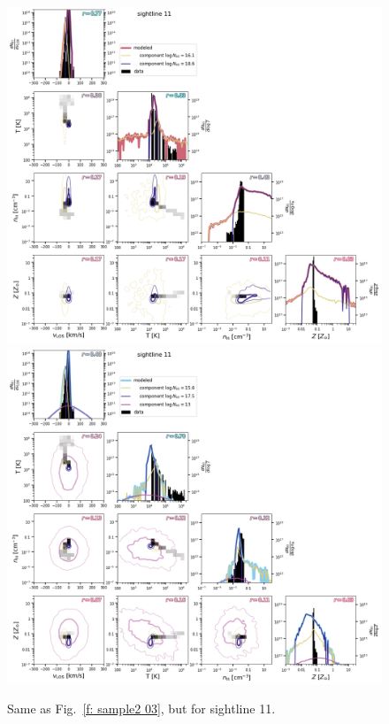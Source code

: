 \documentclass[fleqn,usenatbib]{mnras}
\begin{document}
\begin{figure}
    \centering
    \includegraphics[height=0.45\textheight]{figures/sample2/original/sightline_0011.png}
    \includegraphics[height=0.45\textheight]{figures/sample2/high-z/sightline_0011.png}
    \label{f: sample2 11}
    \caption{Same as Fig.~\ref{f: sample2 03}, but for sightline 11.}
\end{figure}
\end{document}
